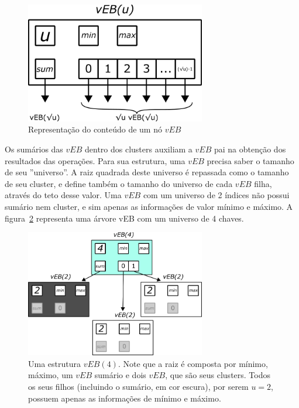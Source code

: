 \documentclass[12pt]{article}
\begin{document}
\begin{figure}[ht]
\centering
\includegraphics[width=0.7\textwidth]{vEB.png}
\caption{Representação do conteúdo de um nó $vEB$}
\label{fig:vEB}
\end{figure}

Os sumários das $vEB$ dentro dos clusters auxiliam a $vEB$ pai na obtenção dos resultados das operações. Para sua estrutura, uma $vEB$ precisa saber o tamanho de seu ''universo''. A raiz quadrada deste universo é repassada como o tamanho de seu cluster, e define também o tamanho do universo de cada $vEB$ filha, através do teto desse valor. Uma $vEB$ com um universo de 2 índices não possui sumário nem cluster, e sim apenas as informações de valor mínimo e máximo. A figura~\ref{fig:vEB(4)} representa uma árvore vEB com um universo de 4 chaves.

\begin{figure}[ht]
\centering
\includegraphics[width=0.7\textwidth]{vEB(4).png}
\caption{Uma estrutura $vEB(4)$. Note que a raiz é composta por mínimo, máximo, um $vEB$ sumário e dois $vEB$, que são seus clusters. Todos os seus filhos (incluindo o sumário, em cor escura), por serem $u=2$, possuem apenas as informações de mínimo e máximo.}
\label{fig:vEB(4)}
\end{figure}
\end{document}
